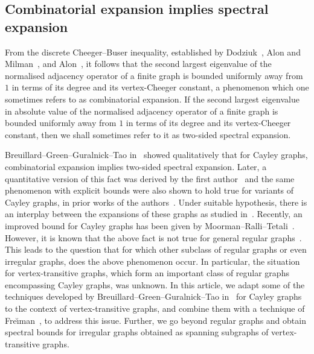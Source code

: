 \documentclass[ALCO,Unicode,published]{cedram}
\begin{document}
\subsection{Combinatorial expansion implies spectral expansion}
From the discrete Cheeger--Buser inequality, established by Dodziuk~\cite{DodziukDifferenceEqnIsoperimetricIneq}, Alon and Milman~\cite{AlonMilmanIsoperiIneqSupConcen}, and Alon~\cite{AlonEigenvalueExpand}, it follows that the second largest eigenvalue of the normalised adjacency operator of a finite graph is bounded uniformly away from $1$ in terms of its degree and its vertex-Cheeger constant, a phenomenon which one sometimes refers to as combinatorial expansion. If the second largest eigenvalue in absolute value of the normalised adjacency operator of a finite graph is bounded uniformly away from $1$ in terms of its degree and its vertex-Cheeger constant, then we shall sometimes refer to it as two-sided spectral expansion.

Breuillard--Green--Guralnick--Tao in~\cite[Appendix E]{BGGTExpansionSimpleLie} showed qualitatively that for Cayley graphs, combinatorial expansion implies two-sided spectral expansion. Later, a quantitative version of this fact was derived by the first author~\cite{BiswasCheegerCayley} and the same phenomenon with explicit bounds were also shown to hold true for variants of Cayley graphs, in prior works of the authors~\cite{CheegerCayleySum, CheegerTwisted}. Under suitable hypothesis, there is an interplay between the expansions of these graphs as studied in~\cite{Expansion}. Recently, an improved bound for Cayley graphs has been given by Moorman--Ralli--Tetali~\cite{CayleyBottomBipartite}. However, it is known that the above fact is not true for general regular graphs~\cite[Example 2.1]{CayleyBottomBipartite}. This leads to the question that for which other subclass of regular graphs or even irregular graphs, does the above phenomenon occur. In particular, the situation for vertex-transitive graphs, which form an important class of regular graphs encompassing Cayley graphs, was unknown. In this article, we adapt some of the techniques developed by Breuillard--Green--Guralnick--Tao in~\cite[Appendix E]{BGGTExpansionSimpleLie} for Cayley graphs to the context of vertex-transitive graphs, and combine them with a technique of Fre\u{\i}man~\cite{FreimanGroupsInverseProb}, to address this issue. Further, we go beyond regular graphs and obtain spectral bounds for irregular graphs obtained as spanning subgraphs of vertex-transitive graphs.
\end{document}
